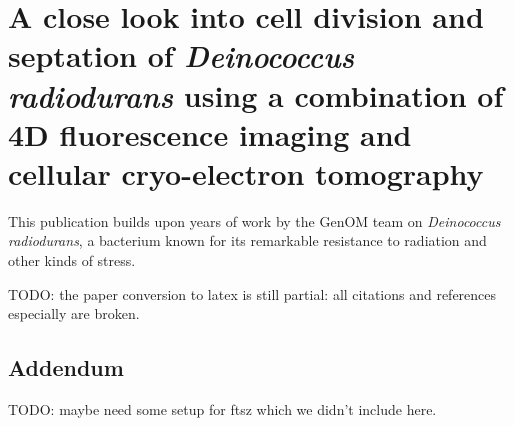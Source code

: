 \chapter[\textit{D. radiodurans}: cell division and septation]{A close look into cell division and septation of \textit{Deinococcus radiodurans} using a combination of 4D fluorescence imaging and cellular cryo-electron tomography}\label{drad}

This publication builds upon years of work by the GenOM team on \textit{Deinococcus radiodurans}, a bacterium known for its remarkable resistance to radiation and other kinds of stress.

\localtableofcontents


TODO: the paper conversion to latex is still partial: all citations and references especially are broken.



\section{Addendum}

TODO: maybe need some setup for ftsz which we didn't include here.
